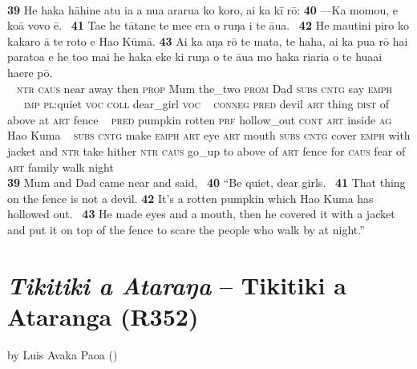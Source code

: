 {~

\bigskip\gll
\textbf{\textup{39}} He haka hāhine atu ia a nua ararua ko koro, {\ꞌ}ai ka kī rō: \textbf{\textup{40}} —Ka momou, e koā vovo ē. ~\textbf{\textup{41}} Ta{\ꞌ}e he tātane te me{\ꞌ}e era o ruŋa i te {\ꞌ}āua. ~\textbf{\textup{42}} He mautini piro ko kakaro {\ꞌ}ā te roto e Hao Kūmā. \textbf{\textup{43}} {\ꞌ}Ai ka aŋa rō te mata, te haha, {\ꞌ}ai ka pu{\ꞌ}a rō hai paratoa {\ꞌ}e he to{\ꞌ}o mai he haka eke ki ruŋa o te {\ꞌ}āua mo haka ri{\ꞌ}ari{\ꞌ}a o te hua{\ꞌ}ai ha{\ꞌ}ere pō.\\
~ \textsc{ntr} \textsc{caus} near away then \textsc{prop} Mum the\_two \textsc{prom} Dad \textsc{subs} \textsc{cntg} say \textsc{emph} ~ ~~~\textsc{imp} \textsc{pl}:quiet \textsc{voc} \textsc{coll} dear\_girl \textsc{voc} ~ \textsc{conneg} \textsc{pred} devil \textsc{art} thing \textsc{dist} of above at \textsc{art} fence ~ \textsc{pred} pumpkin rotten \textsc{prf} hollow\_out \textsc{cont} \textsc{art} inside \textsc{ag} Hao Kuma ~ \textsc{subs} \textsc{cntg} make \textsc{emph} \textsc{art} eye \textsc{art} mouth \textsc{subs} \textsc{cntg} cover \textsc{emph} with jacket and \textsc{ntr} take hither \textsc{ntr} \textsc{caus} go\_up to above of \textsc{art} fence for \textsc{caus} fear of \textsc{art} family walk night\\

\medskip\glt
\textbf{\textup{39}} Mum and Dad came near and said, ~\textbf{\textup{40}} “Be quiet, dear girls. ~\textbf{\textup{41}} That thing on the fence is not a devil. \textbf{\textup{42}} It’s a rotten pumpkin which Hao Kuma has hollowed out. ~\textbf{\textup{43}} He made eyes and a mouth, then he covered it with a jacket and put it on top of the fence to scare the people who walk by at night.”

\newpage
\section*{\textit{Tikitiki {\ꞌ}a {\ꞌ}Ataraŋa} – Tikitiki a Ataranga (R352)}\label{sec:a.2}

by Luis Avaka Paoa (\citealt[Vol. 4:93–98]{WeberWeber1990Mai})

~

}
